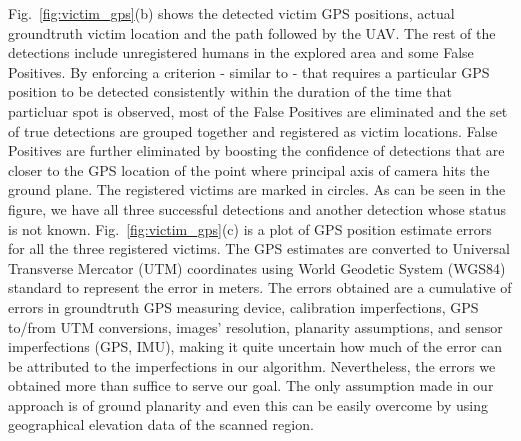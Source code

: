 \documentclass[runningheads]{llncs}
\begin{document}
Fig.~\ref{fig:victim_gps}(b) shows the detected victim GPS positions, actual groundtruth victim location and the path followed by the UAV. The rest of the detections include unregistered humans in the explored area and some False Positives. By enforcing a criterion - similar to \cite{rudol2008human} - that requires a particular GPS position to be detected consistently within the duration of the time that particluar spot is observed, most of the False Positives are eliminated and the set of true detections are grouped together and registered as victim locations. False Positives are further eliminated by boosting the confidence of detections that are closer to the GPS location of the point where principal axis of camera hits the ground plane. The registered victims are marked in circles. As can be seen in the figure, we have all three successful detections and another detection whose status is not known. Fig.~\ref{fig:victim_gps}(c) is a plot of GPS position estimate errors for all the three registered victims. The GPS estimates are converted to Universal Transverse Mercator (UTM) coordinates using World Geodetic System (WGS84) standard \cite{WGS} to represent the error in meters. The errors obtained are a cumulative of errors in groundtruth GPS measuring device, calibration imperfections, GPS to/from UTM conversions, images' resolution, planarity assumptions, and sensor imperfections (GPS, IMU), making it quite uncertain how much of the error can be attributed to the imperfections in our algorithm. Nevertheless, the errors we obtained more than suffice to serve our goal. The only assumption made in our approach is of ground planarity and even this can be easily overcome by using geographical elevation data of the scanned region.
\end{document}
